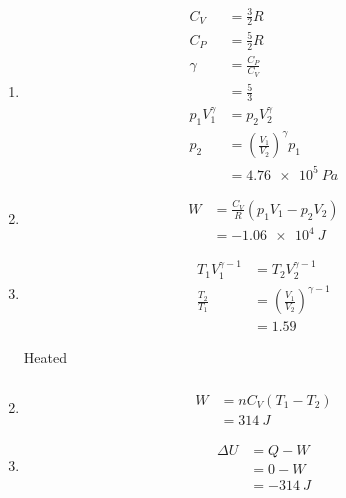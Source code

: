 \documentclass{article}
\begin{document}
\begin{enumerate}
  \item

        \begin{align*}
          C_V            & = \frac{3}{2} R                             \\
          C_P            & = \frac{5}{2} R                             \\
          \gamma         & = \frac{C_P}{C_V}                           \\
                         & = \frac{5}{3}                               \\
          p_1 V_1^\gamma & = p_2 V_2^\gamma                            \\
          p_2            & = \left( \frac{V_1}{V_2} \right)^\gamma p_1 \\
                         & = \qty{4.76e5}{Pa}
        \end{align*}

  \item

        \begin{align*}
          W & = \frac{C_V}{R} (p_1 V_1 - p_2 V_2) \\
            & = \qty{-1.06e4}{J}
        \end{align*}

  \item

        \begin{align*}
          T_1 V_1^{\gamma - 1} & = T_2 V_2^{\gamma - 1}                        \\
          \frac{T_2}{T_1}      & = \left( \frac{V_1}{V_2} \right)^{\gamma - 1} \\
                               & = 1.59
        \end{align*}

        Heated
\end{enumerate}

\setcounter{subsubsection}{28}
\subsubsection{}

\begin{enumerate}
  \setcounter{enumi}{1}
  \item

        \begin{align*}
          W & = n C_V (T_1 - T_2) \\
            & = \qty{314}{J}
        \end{align*}

  \item

        \begin{align*}
          \Delta U & = Q - W         \\
                   & = 0 - W         \\
                   & = \qty{-314}{J}
        \end{align*}
\end{enumerate}
\end{document}
